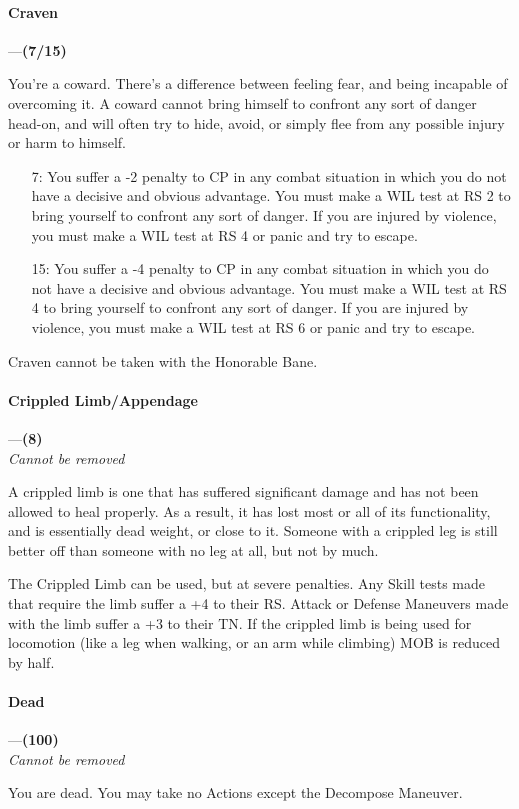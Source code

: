 \documentclass[oneside,11pt,english]{book}
\begin{document}
\paragraph{\label{bane:Craven}Craven}---\quad\textbf{(7/15) }\par
You're a coward. There's a difference between feeling fear, and being incapable of overcoming it. A 
coward cannot bring himself to confront any sort of danger head-on, and will often try to hide, avoid, or 
simply flee from any possible injury or harm to himself. 

\begin{itemize}
	\item [7:] You suffer a -2 penalty to CP in any combat situation in which you do not have a decisive and obvious advantage. You must make a WIL test at RS 2 to bring yourself to confront any sort of danger. If you are injured by violence, you must make a WIL test at RS 4 or panic and try to escape. 
	\item [15:] You suffer a -4 penalty to CP in any combat situation in which you do not have a decisive and obvious advantage. You must make a WIL test at RS 4 to bring yourself to confront any sort of danger. If you are injured by violence, you must make a WIL test at RS 6 or panic and try to escape.
\end{itemize}
Craven cannot be taken with the Honorable Bane. 
\paragraph{\label{bane:Crippled Limb/Appendage}Crippled Limb/Appendage}---\quad\textbf{(8)}\\
\textit{Cannot be removed}\par
A crippled limb is one that has suffered significant damage and has not been allowed to heal properly. As 
a result, it has lost most or all of its functionality, and is essentially dead weight, or close to it. Someone with a crippled leg is still better off than someone with no leg at all, but not by much.


The Crippled Limb can be used, but at severe penalties. Any Skill tests made that require the limb suffer a +4 to their RS. Attack or Defense Maneuvers made with the limb suffer a +3 to their TN. If the crippled limb is being used for locomotion (like a leg when walking, or an arm while climbing) MOB is reduced by half.
\paragraph{\label{bane:Dead}Dead}---\quad\textbf{(100) }\\
\textit{Cannot be removed}\par
You are dead. You may take no Actions except the Decompose Maneuver.
\end{document}
